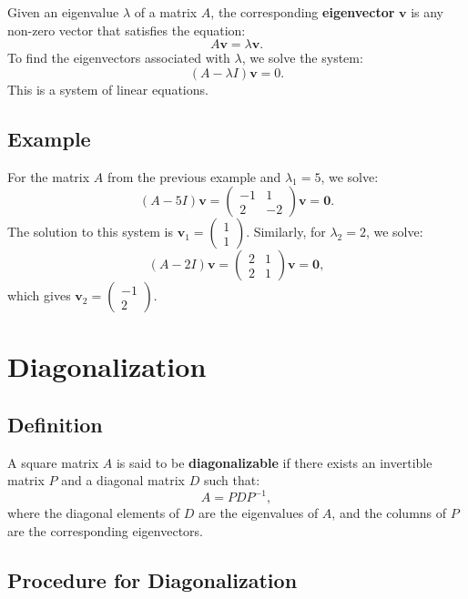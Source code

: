 \documentclass[]{article}
\begin{document}
	Given an eigenvalue \( \lambda \) of a matrix \( A \), the corresponding \textbf{eigenvector} \( \mathbf{v} \) is any non-zero vector that satisfies the equation:
	\[
	A \mathbf{v} = \lambda \mathbf{v}.
	\]
	To find the eigenvectors associated with \( \lambda \), we solve the system:
	\[
	(A - \lambda I)\mathbf{v} = 0.
	\]
	This is a system of linear equations.
	
	\subsection{Example}
	
	For the matrix \( A \) from the previous example and \( \lambda_1 = 5 \), we solve:
	\[
	(A - 5I)\mathbf{v} = \begin{pmatrix}
		-1 & 1 \\
		2 & -2
	\end{pmatrix} \mathbf{v} = \mathbf{0}.
	\]
	The solution to this system is \( \mathbf{v}_1 = \begin{pmatrix} 1 \\ 1 \end{pmatrix} \). Similarly, for \( \lambda_2 = 2 \), we solve:
	\[
	(A - 2I)\mathbf{v} = \begin{pmatrix}
		2 & 1 \\
		2 & 1
	\end{pmatrix} \mathbf{v} = \mathbf{0},
	\]
	which gives \( \mathbf{v}_2 = \begin{pmatrix} -1 \\ 2 \end{pmatrix} \).
	
	\section{Diagonalization}
	
	\subsection{Definition}
	
	A square matrix \( A \) is said to be \textbf{diagonalizable} if there exists an invertible matrix \( P \) and a diagonal matrix \( D \) such that:
	\[
	A = PDP^{-1},
	\]
	where the diagonal elements of \( D \) are the eigenvalues of \( A \), and the columns of \( P \) are the corresponding eigenvectors.
	
	\subsection{Procedure for Diagonalization}
	
\end{document}
